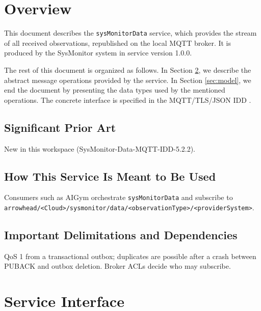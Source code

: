 \documentclass[a4paper]{arrowhead}
\begin{document}
\section{Overview}
\label{sec:overview}

This document describes the \texttt{sysMonitorData} service, which provides the stream of all received observations, republished on the local MQTT broker.
It is produced by the SysMonitor system \cite{smo-sysd} in service version 1.0.0.

The rest of this document is organized as follows.
In Section \ref{sec:operations}, we describe the abstract message operations provided by the service.
In Section \ref{sec:model}, we end the document by presenting the data types used by the mentioned operations.
The concrete interface is specified in the MQTT/TLS/JSON IDD \cite{smo-sysMonitorData-mqtt-idd}.

\subsection{Significant Prior Art}

New in this workspace (SysMonitor-Data-MQTT-IDD-5.2.2).

\subsection{How This Service Is Meant to Be Used}

Consumers such as AIGym orchestrate \texttt{sysMonitorData} and subscribe to \texttt{arrowhead/\allowbreak{}\textless{}Cloud\textgreater{}/\allowbreak{}sysmonitor/\allowbreak{}data/\allowbreak{}\textless{}observation\allowbreak{}Type\textgreater{}/\allowbreak{}\textless{}provider\allowbreak{}System\textgreater{}}.

\subsection{Important Delimitations and Dependencies}
\label{sec:delimitations}

QoS 1 from a transactional outbox; duplicates are possible after a crash between PUBACK and outbox deletion. Broker ACLs decide who may subscribe.

\newpage

\section{Service Interface}
\label{sec:operations}
\end{document}
